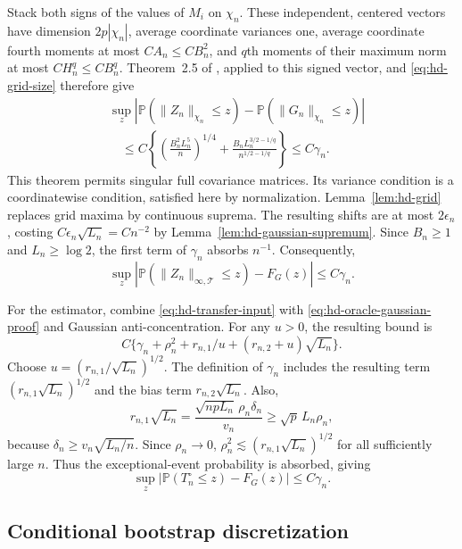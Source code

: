 \documentclass[12pt]{article}
\newcommand{\prob}{\mathbb{P}}
\numberwithin{equation}{section}
\begin{document}
Stack both signs of the values of $M_i$ on $\chi_n$. These independent,
centered vectors have dimension $2p|\chi_n|$, average coordinate variances
one, average coordinate fourth moments at most $CA_n\le CB_n^2$,
and $q$th moments of their maximum norm at most $CH_n^q\le CB_n^q$.
Theorem~2.5 of \citet{chernozhukov_et_al_2022}, applied to this signed
vector, and \eqref{eq:hd-grid-size} therefore give
\[
\begin{aligned}
&\sup_z\left|\prob(\|Z_n\|_{\chi_n}\le z)
             -\prob(\|G_n\|_{\chi_n}\le z)\right|\\
&\quad\le C\left\{\left(\frac{B_n^2L_n^5}{n}\right)^{1/4}
+\frac{B_nL_n^{3/2-1/q}}{n^{1/2-1/q}}\right\}\le C\gamma_n.
\end{aligned}
\]
This theorem permits singular full covariance matrices. Its variance
condition is a coordinatewise condition, satisfied here by normalization.
Lemma~\ref{lem:hd-grid} replaces grid maxima by continuous suprema.
The resulting shifts are at most $2\epsilon_n$, costing
$C\epsilon_n\sqrt{L_n}=Cn^{-2}$ by
Lemma~\ref{lem:hd-gaussian-supremum}. Since $B_n\ge1$ and
$L_n\ge\log2$, the first term of $\gamma_n$ absorbs $n^{-1}$.
Consequently,
\begin{equation}
 \sup_z|\prob(\|Z_n\|_{\infty,\mathcal T}\le z)-F_G(z)|
 \le C\gamma_n.
 \label{eq:hd-oracle-gaussian-proof}
\end{equation}

For the estimator, combine \eqref{eq:hd-transfer-input} with
\eqref{eq:hd-oracle-gaussian-proof} and Gaussian anti-concentration.
For any $u>0$, the resulting bound is
\[
 C\{\gamma_n+\rho_n^2+r_{n,1}/u
                  +(r_{n,2}+u)\sqrt{L_n}\}.
\]
Choose $u=(r_{n,1}/\sqrt{L_n})^{1/2}$. The definition of
$\gamma_n$ includes the resulting term
$(r_{n,1}\sqrt{L_n})^{1/2}$ and the bias term
$r_{n,2}\sqrt{L_n}$. Also,
\[
r_{n,1}\sqrt{L_n}
=\frac{\sqrt{npL_n}\,\rho_n\delta_n}{v_n}
\ge\sqrt p\,L_n\rho_n,
\]
because $\delta_n\ge v_n\sqrt{L_n/n}$. Since $\rho_n\to0$,
$\rho_n^2\lesssim(r_{n,1}\sqrt{L_n})^{1/2}$ for all sufficiently
large $n$. Thus the exceptional-event probability is absorbed, giving
\begin{equation}
 \sup_z|\prob(T_n^\circ\le z)-F_G(z)|\le C\gamma_n.
 \label{eq:hd-estimator-gaussian-proof}
\end{equation}

\subsection{Conditional bootstrap discretization}
\end{document}
